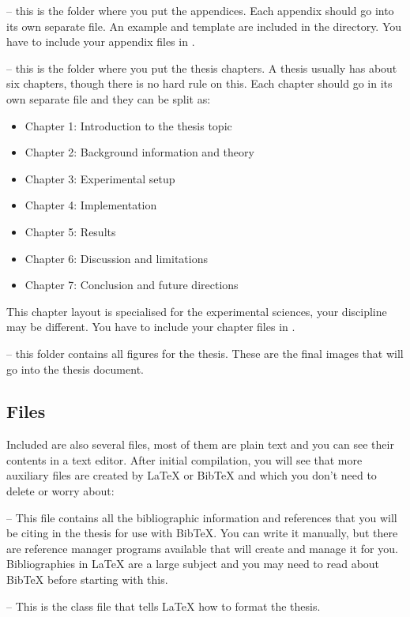  -- this is the folder where you put the appendices. Each appendix should go into its own separate  file. An example and template are included in the directory. You have to include your appendix files in .

 -- this is the folder where you put the thesis chapters. A thesis usually has about six chapters, though there is no hard rule on this. Each chapter should go in its own separate  file and they can be split as:
\begin{itemize}
\item Chapter 1: Introduction to the thesis topic
\item Chapter 2: Background information and theory
\item Chapter 3: Experimental setup
\item Chapter 4: Implementation
\item Chapter 5: Results
\item Chapter 6: Discussion and limitations
\item Chapter 7: Conclusion and future directions
\end{itemize}

This chapter layout is specialised for the experimental sciences, your discipline may be different. You have to include your chapter files in .

 -- this folder contains all figures for the thesis. These are the final images that will go into the thesis document.

\subsection{Files}

Included are also several files, most of them are plain text and you can see their contents in a text editor. After initial compilation, you will see that more auxiliary files are created by LaTeX or BibTeX and which you don't need to delete or worry about:

 -- This file contains all the bibliographic information and references that you will be citing in the thesis for use with BibTeX. You can write it manually, but there are reference manager programs available that will create and manage it for you. Bibliographies in LaTeX are a large subject and you may need to read about BibTeX before starting with this.

 -- This is the class file that tells LaTeX how to format the thesis.

